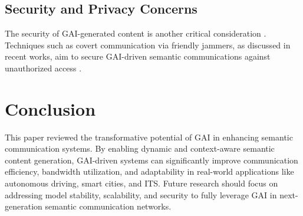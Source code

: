 \documentclass[journal,transmag]{IEEEtran}
\begin{document}
\subsection{Security and Privacy Concerns}
The security of GAI-generated content is another critical consideration \cite{10447237}. Techniques such as covert communication via friendly jammers, as discussed in recent works, aim to secure GAI-driven semantic communications against unauthorized access \cite{9797984}.

\section{Conclusion}
This paper reviewed the transformative potential of GAI in enhancing semantic communication systems. By enabling dynamic and context-aware semantic content generation, GAI-driven systems can significantly improve communication efficiency, bandwidth utilization, and adaptability in real-world applications like autonomous driving, smart cities, and ITS. Future research should focus on addressing model stability, scalability, and security to fully leverage GAI in next-generation semantic communication networks.



\end{document}
